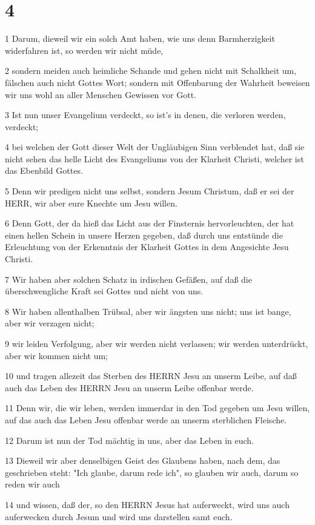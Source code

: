 \chapter{4}

\par 1 Darum, dieweil wir ein solch Amt haben, wie uns denn Barmherzigkeit widerfahren ist, so werden wir nicht müde,
\par 2 sondern meiden auch heimliche Schande und gehen nicht mit Schalkheit um, fälschen auch nicht Gottes Wort; sondern mit Offenbarung der Wahrheit beweisen wir uns wohl an aller Menschen Gewissen vor Gott.
\par 3 Ist nun unser Evangelium verdeckt, so ist's in denen, die verloren werden, verdeckt;
\par 4 bei welchen der Gott dieser Welt der Ungläubigen Sinn verblendet hat, daß sie nicht sehen das helle Licht des Evangeliums von der Klarheit Christi, welcher ist das Ebenbild Gottes.
\par 5 Denn wir predigen nicht uns selbst, sondern Jesum Christum, daß er sei der HERR, wir aber eure Knechte um Jesu willen.
\par 6 Denn Gott, der da hieß das Licht aus der Finsternis hervorleuchten, der hat einen hellen Schein in unsere Herzen gegeben, daß durch uns entstünde die Erleuchtung von der Erkenntnis der Klarheit Gottes in dem Angesichte Jesu Christi.
\par 7 Wir haben aber solchen Schatz in irdischen Gefäßen, auf daß die überschwengliche Kraft sei Gottes und nicht von uns.
\par 8 Wir haben allenthalben Trübsal, aber wir ängsten uns nicht; uns ist bange, aber wir verzagen nicht;
\par 9 wir leiden Verfolgung, aber wir werden nicht verlassen; wir werden unterdrückt, aber wir kommen nicht um;
\par 10 und tragen allezeit das Sterben des HERRN Jesu an unserm Leibe, auf daß auch das Leben des HERRN Jesu an unserm Leibe offenbar werde.
\par 11 Denn wir, die wir leben, werden immerdar in den Tod gegeben um Jesu willen, auf das auch das Leben Jesu offenbar werde an unserm sterblichen Fleische.
\par 12 Darum ist nun der Tod mächtig in uns, aber das Leben in euch.
\par 13 Dieweil wir aber denselbigen Geist des Glaubens haben, nach dem, das geschrieben steht: "Ich glaube, darum rede ich", so glauben wir auch, darum so reden wir auch
\par 14 und wissen, daß der, so den HERRN Jesus hat auferweckt, wird uns auch auferwecken durch Jesum und wird uns darstellen samt euch.
